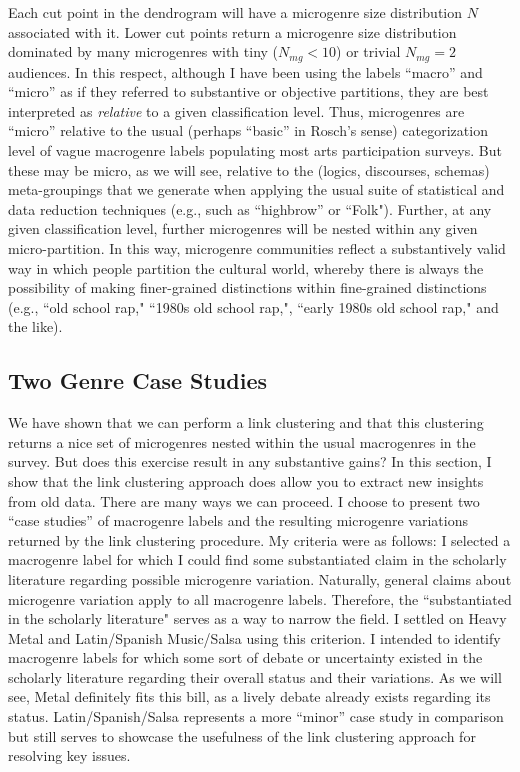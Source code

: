 \documentclass[a4paper,12pt]{extarticle}
\begin{document}
Each cut point in the dendrogram will have a microgenre size distribution $N$ associated with it. Lower cut points return a microgenre size distribution dominated by many microgenres with tiny ($N_{mg} < 10$) or trivial $N_{mg} = 2$ audiences. In this respect, although I have been using the labels ``macro'' and ``micro'' as if they referred to substantive or objective partitions, they are best interpreted as {\em relative} to a given classification level. Thus, microgenres are ``micro'' relative to the usual (perhaps ``basic'' in Rosch's \citeyearpar{Rosch1978-ue} sense) categorization level of vague macrogenre labels populating most arts participation surveys. But these may be micro, as we will see, relative to the (logics, discourses, schemas) meta-groupings that we generate when applying the usual suite of statistical and data reduction techniques (e.g., such as ``highbrow'' or ``Folk"). Further, at any given classification level, further microgenres will be nested within any given micro-partition. In this way, microgenre communities reflect a substantively valid way in which people partition the cultural world, whereby there is always the possibility of making finer-grained distinctions within fine-grained distinctions (e.g., ``old school rap," ``1980s old school rap,", ``early 1980s old school rap," and the like). 
 
\subsection{Two Genre Case Studies}
We have shown that we can perform a link clustering and that this clustering returns a nice set of microgenres nested within the usual macrogenres in the survey. But does this exercise result in any substantive gains? In this section, I show that the link clustering approach does allow you to extract new insights from old data. There are many ways we can proceed. I choose to present two ``case studies'' of macrogenre labels and the resulting microgenre variations returned by the link clustering procedure. My criteria were as follows: I selected a macrogenre label for which I could find some substantiated claim in the scholarly literature regarding possible microgenre variation. Naturally, general claims about microgenre variation apply to all macrogenre labels. Therefore, the ``substantiated in the scholarly literature" serves as a way to narrow the field. I settled on Heavy Metal and Latin/Spanish Music/Salsa using this criterion. I intended to identify macrogenre labels for which some sort of debate or uncertainty existed in the scholarly literature regarding their overall status and their variations. As we will see, Metal definitely fits this bill, as a lively debate already exists regarding its status. Latin/Spanish/Salsa represents a more ``minor'' case study in comparison but still serves to showcase the usefulness of the link clustering approach for resolving key issues.
\end{document}
